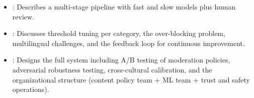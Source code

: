 \begin{interviewq}

\goodgreat
\begin{itemize}
    \item {}: Describes a multi-stage pipeline with fast and slow
    models plus human review.
    \item {}: Discusses threshold tuning per category, the
    over-blocking problem, multilingual challenges, and the feedback loop
    for continuous improvement.
    \item {}: Designs the full system including A/B testing of
    moderation policies, adversarial robustness testing, cross-cultural
    calibration, and the organizational structure (content policy team +
    ML team + trust and safety operations).
\end{itemize}

\end{interviewq}

\vspace{0.5em}

